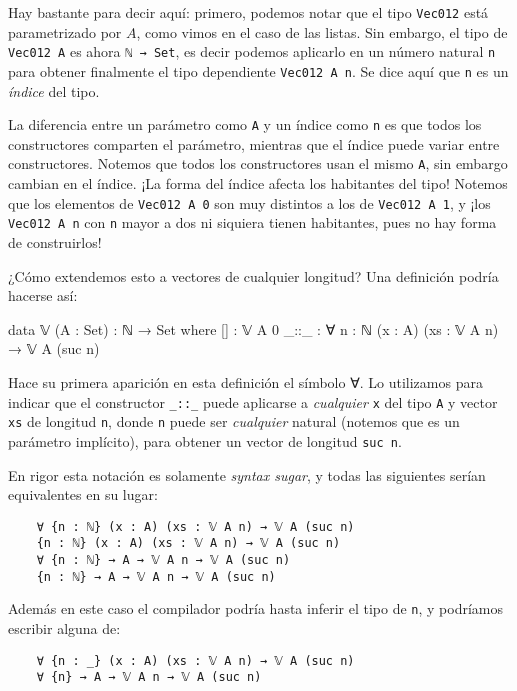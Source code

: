 \documentclass[11pt]{article} %
\begin{document}
Hay bastante para decir aquí: primero, podemos notar que el tipo \verb|Vec012| está parametrizado por $A$, como vimos en el caso de las listas. Sin embargo, el tipo de \verb|Vec012 A| es ahora \verb|ℕ → Set|, es decir podemos aplicarlo en un número natural \verb|n| para obtener finalmente el tipo dependiente \verb|Vec012 A n|. Se dice aquí que \verb|n| es un \textit{índice} del tipo. 

La diferencia entre un parámetro como \verb|A| y un índice como \verb|n| es que todos los constructores comparten el parámetro, mientras que el índice puede variar entre constructores. Notemos que todos los constructores usan el mismo \verb|A|, sin embargo cambian en el índice. ¡La forma del índice afecta los habitantes del tipo! Notemos que los elementos de \verb|Vec012 A 0| son muy distintos a los de \verb|Vec012 A 1|, y ¡los \verb|Vec012 A n| con \verb|n| mayor a dos ni siquiera tienen habitantes, pues no hay forma de construirlos!


¿Cómo extendemos esto a vectores de cualquier longitud? Una definición podría hacerse así:

\begin{code}
data 𝕍 (A : Set) : ℕ → Set where
  [] : 𝕍 A 0
  _::_ : ∀ {n : ℕ} (x : A) (xs : 𝕍 A n) → 𝕍 A (suc n)
\end{code}

Hace su primera aparición en esta definición el símbolo ∀. Lo utilizamos para indicar que el constructor \verb|_::_| puede aplicarse a \textit{cualquier} \verb|x| del tipo \verb|A| y vector \verb|xs| de longitud \verb|n|, donde \verb|n| puede ser \textit{cualquier} natural (notemos que es un parámetro implícito), para obtener un vector de longitud \verb|suc n|.

En rigor esta notación es solamente \textit{syntax sugar}, y todas las siguientes serían equivalentes en su lugar:

\begin{verbatim}
    ∀ {n : ℕ} (x : A) (xs : 𝕍 A n) → 𝕍 A (suc n)
    {n : ℕ} (x : A) (xs : 𝕍 A n) → 𝕍 A (suc n)
    ∀ {n : ℕ} → A → 𝕍 A n → 𝕍 A (suc n)
    {n : ℕ} → A → 𝕍 A n → 𝕍 A (suc n)
\end{verbatim}

Además en este caso el compilador podría hasta inferir el tipo de \verb|n|, y podríamos escribir alguna de:

\begin{verbatim}
    ∀ {n : _} (x : A) (xs : 𝕍 A n) → 𝕍 A (suc n)
    ∀ {n} → A → 𝕍 A n → 𝕍 A (suc n)
\end{verbatim}
\end{document}
